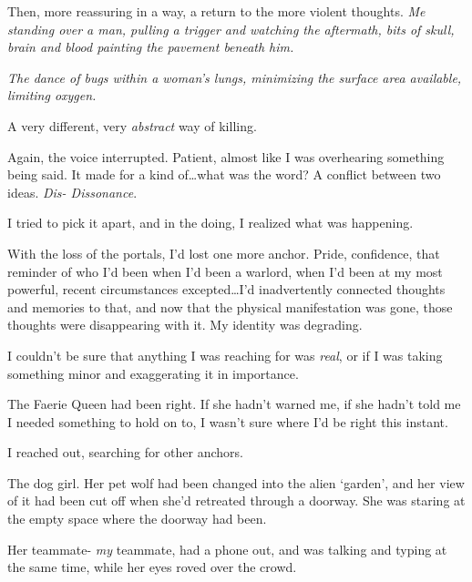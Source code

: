 Then, more reassuring in a way, a return to the more violent thoughts.  \emph{Me standing over a man, pulling a trigger and watching the aftermath, bits of skull, brain and blood painting the pavement beneath him.}



\emph{The dance of bugs within a woman's lungs, minimizing the surface area available, limiting oxygen.}



A very different, very \emph{abstract} way of killing.



Again, the voice interrupted.  Patient, almost like I was overhearing something being said.  It made for a kind of\ldots what was the word?  A conflict between two ideas.  \emph{Dis- Dissonance}.



I tried to pick it apart, and in the doing, I realized what was happening.



With the loss of the portals, I'd lost one more anchor.  Pride, confidence, that reminder of who I'd been when I'd been a warlord, when I'd been at my most powerful, recent circumstances excepted\ldots I'd inadvertently connected thoughts and memories to that, and now that the physical manifestation was gone, those thoughts were disappearing with it.  My identity was degrading.



I couldn't be sure that anything I was reaching for was \emph{real}, or if I was taking something minor and exaggerating it in importance.



The Faerie Queen had been right.  If she hadn't warned me, if she hadn't told me I needed something to hold on to, I wasn't sure where I'd be right this instant.



I reached out, searching for other anchors.



The dog girl.  Her pet wolf had been changed into the alien `garden', and her view of it had been cut off when she'd retreated through a doorway.  She was staring at the empty space where the doorway had been.



Her teammate- \emph{my} teammate, had a phone out, and was talking and typing at the same time, while her eyes roved over the crowd.



